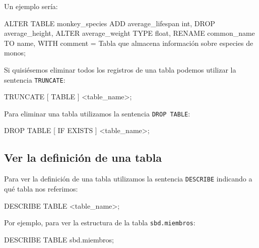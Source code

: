 \documentclass[
]{book}
\newenvironment{Shaded}{}{}
\newcommand{\NormalTok}[1]{#1}
\begin{document}
Un ejemplo sería:

\begin{Shaded}
\begin{Highlighting}[]
\NormalTok{ALTER TABLE monkey\_species}
\NormalTok{  ADD average\_lifespan int,}
\NormalTok{  DROP average\_height,}
\NormalTok{  ALTER average\_weight TYPE float,}
\NormalTok{  RENAME common\_name TO name,}
\NormalTok{  WITH comment = \textquotesingle{}Tabla que almacena información sobre especies de monos\textquotesingle{};}
\end{Highlighting}
\end{Shaded}

Si quisiésemos eliminar todos los registros de una tabla podemos utilizar la sentencia \texttt{TRUNCATE}:

\begin{Shaded}
\begin{Highlighting}[]
\NormalTok{TRUNCATE [ TABLE ] \textless{}table\_name\textgreater{};}
\end{Highlighting}
\end{Shaded}

Para eliminar una tabla utilizamos la sentencia \texttt{DROP\ TABLE}:

\begin{Shaded}
\begin{Highlighting}[]
\NormalTok{DROP TABLE [ IF EXISTS ] \textless{}table\_name\textgreater{};}
\end{Highlighting}
\end{Shaded}

\subsection{Ver la definición de una tabla}\label{ver-la-definiciuxf3n-de-una-tabla}

Para ver la definición de una tabla utilizamos la sentencia \texttt{DESCRIBE} indicando a qué tabla nos referimos:

\begin{Shaded}
\begin{Highlighting}[]
\NormalTok{DESCRIBE TABLE \textless{}table\_name\textgreater{};}
\end{Highlighting}
\end{Shaded}

Por ejemplo, para ver la estructura de la tabla \texttt{sbd.miembros}:

\begin{Shaded}
\begin{Highlighting}[]
\NormalTok{DESCRIBE TABLE sbd.miembros;}
\end{Highlighting}
\end{Shaded}
\end{document}
